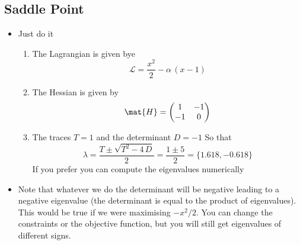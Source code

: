 \documentclass[11pt]{article}
\begin{document}
\subsection{Saddle Point}
\label{sec:orged22394}
\begin{itemize}
\item Just do it
\begin{enumerate}
\item The Lagrangian is given bye
$$ \mathcal{L} = \frac{x^2}{2} - \alpha\, (x-1) $$
\item The Hessian is given by
$$ \mat{H} = \begin{pmatrix} 1 & -1 \\ -1 &0 \end{pmatrix} $$
\item The traces \(T = 1\) and the determinant \(D = -1\) So that
$$ \lambda = \frac{T \pm \sqrt{T^2 - 4\, D}}{2} = \frac{1
	\pm{5}}{2} = \{1.618, -0.618\} $$
If you prefer you can compute the eigenvalues numerically
\end{enumerate}
\item Note that whatever we do the determinant will be negative leading
to a negative eigenvalue (the determinant is equal to the product
of eigenvalues).   This would be true if we were maximising
\(-x^2/2\).  You can change the constraints or the objective
function, but you will still get eigenvalues of different signs.
\end{itemize}
\end{document}
